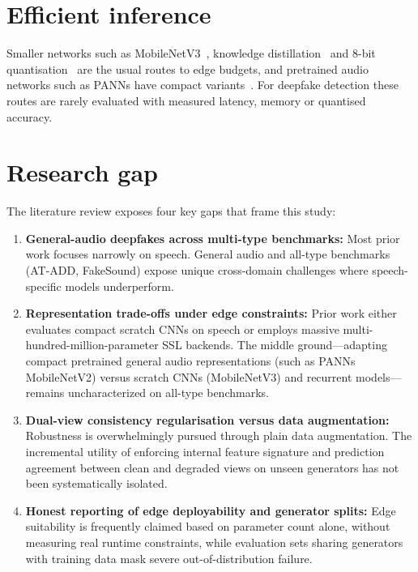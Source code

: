 \section{Efficient inference}

Smaller networks such as MobileNetV3~\cite{howard2019mobilenetv3}, knowledge distillation~\cite{hinton2015distilling} and 8-bit quantisation~\cite{jacob2018quantization} are the usual routes to edge budgets, and pretrained audio networks such as PANNs have compact variants~\cite{kong2020panns}. For deepfake detection these routes are rarely evaluated with measured latency, memory or quantised accuracy.

\section{Research gap}

The literature review exposes four key gaps that frame this study:
\begin{enumerate}
  \item \textbf{General-audio deepfakes across multi-type benchmarks:} Most prior work focuses narrowly on speech. General audio and all-type benchmarks (AT-ADD, FakeSound) expose unique cross-domain challenges where speech-specific models underperform.
  \item \textbf{Representation trade-offs under edge constraints:} Prior work either evaluates compact scratch CNNs on speech or employs massive multi-hundred-million-parameter SSL backends. The middle ground---adapting compact pretrained general audio representations (such as PANNs MobileNetV2) versus scratch CNNs (MobileNetV3) and recurrent models---remains uncharacterized on all-type benchmarks.
  \item \textbf{Dual-view consistency regularisation versus data augmentation:} Robustness is overwhelmingly pursued through plain data augmentation. The incremental utility of enforcing internal feature signature and prediction agreement between clean and degraded views on unseen generators has not been systematically isolated.
  \item \textbf{Honest reporting of edge deployability and generator splits:} Edge suitability is frequently claimed based on parameter count alone, without measuring real runtime constraints, while evaluation sets sharing generators with training data mask severe out-of-distribution failure.
\end{enumerate}

